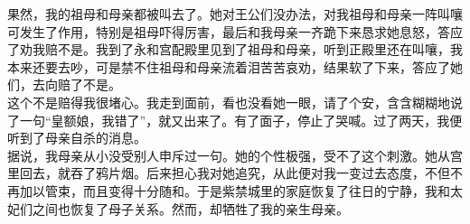 果然，我的祖母和母亲都被叫去了。她对王公们没办法，对我祖母和母亲一阵叫嚷可发生了作用，特别是祖母吓得厉害，最后和我母亲一齐跪下来恳求她息怒，答应了劝我赔不是。我到了永和宫配殿里见到了祖母和母亲，听到正殿里还在叫嚷，我本来还要去吵，可是禁不住祖母和母亲流着泪苦苦哀劝，结果软了下来，答应了她们，去向赔了不是。\\

这个不是赔得我很堵心。我走到面前，看也没看她一眼，请了个安，含含糊糊地说了一句“皇额娘，我错了”，就又出来了。有了面子，停止了哭喊。过了两天，我便听到了母亲自杀的消息。\\

据说，我母亲从小没受别人申斥过一句。她的个性极强，受不了这个刺激。她从宫里回去，就吞了鸦片烟。后来担心我对她追究，从此便对我一变过去态度，不但不再加以管束，而且变得十分随和。于是紫禁城里的家庭恢复了往日的宁静，我和太妃们之间也恢复了母子关系。然而，却牺牲了我的亲生母亲。
